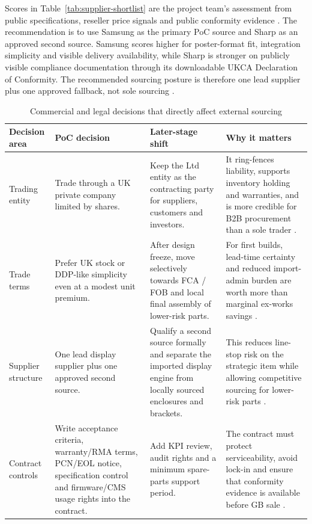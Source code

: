 \documentclass[11pt,a4paper]{article}
\renewcommand{\arraystretch}{1.12}
\begin{document}
Scores in Table~\ref{tab:supplier-shortlist} are the project team's assessment from public specifications, reseller price signals and public conformity evidence \cite{ref23,ref24,ref25,ref26,ref27}. The recommendation is to use Samsung as the primary PoC source and Sharp as an approved second source. Samsung scores higher for poster-format fit, integration simplicity and visible delivery availability, while Sharp is stronger on publicly visible compliance documentation through its downloadable UKCA Declaration of Conformity. The recommended sourcing posture is therefore one lead supplier plus one approved fallback, not sole sourcing \cite{ref23,ref24,ref25,ref26,ref27}.

\begin{table}[H]
\centering
\caption{Commercial and legal decisions that directly affect external sourcing}
\scriptsize
\renewcommand{\arraystretch}{1.08}
\begin{tabularx}{\textwidth}{L{2.7cm}Y Y Y}
\toprule
\textbf{Decision area} & \textbf{PoC decision} & \textbf{Later-stage shift} & \textbf{Why it matters} \\
\midrule
Trading entity & Trade through a UK private company limited by shares. & Keep the Ltd entity as the contracting party for suppliers, customers and investors. & It ring-fences liability, supports inventory holding and warranties, and is more credible for B2B procurement than a sole trader \cite{ref28}. \\
Trade terms & Prefer UK stock or DDP-like simplicity even at a modest unit premium. & After design freeze, move selectively towards FCA / FOB and local final assembly of lower-risk parts. & For first builds, lead-time certainty and reduced import-admin burden are worth more than marginal ex-works savings \cite{ref17}. \\
Supplier structure & One lead display supplier plus one approved second source. & Qualify a second source formally and separate the imported display engine from locally sourced enclosures and brackets. & This reduces line-stop risk on the strategic item while allowing competitive sourcing for lower-risk parts \cite{ref14,ref15}. \\
Contract controls & Write acceptance criteria, warranty/RMA terms, PCN/EOL notice, specification control and firmware/CMS usage rights into the contract. & Add KPI review, audit rights and a minimum spare-parts support period. & The contract must protect serviceability, avoid lock-in and ensure that conformity evidence is available before GB sale \cite{ref17,ref18,ref19,ref20}. \\
\bottomrule
\end{tabularx}
\end{table}
\end{document}

